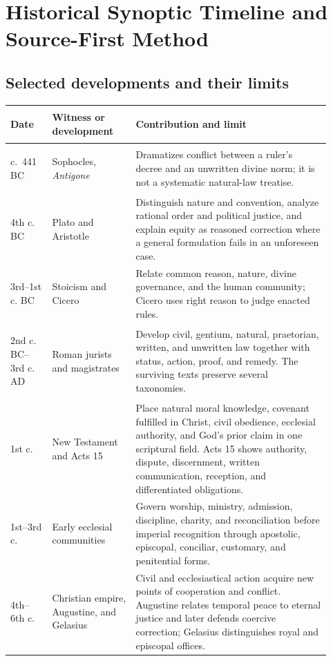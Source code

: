 \section{Historical Synoptic Timeline and Source-First Method}

\subsection{Selected developments and their limits}

\begin{longtable}{>{\bfseries\raggedright\arraybackslash}p{0.12\linewidth}>{\raggedright\arraybackslash}p{0.24\linewidth}>{\raggedright\arraybackslash}p{0.56\linewidth}}
\toprule
\textbf{Date} & \textbf{Witness or development} & \textbf{Contribution and limit}\\
\midrule
\endhead
c.~441 BC & Sophocles, \emph{Antigone} & Dramatizes conflict between a ruler's decree and an unwritten divine norm; it is not a systematic natural-law treatise.\\
4th c. BC & Plato and Aristotle & Distinguish nature and convention, analyze rational order and political justice, and explain equity as reasoned correction where a general formulation fails in an unforeseen case.\\
3rd--1st c. BC & Stoicism and Cicero & Relate common reason, nature, divine governance, and the human community; Cicero uses right reason to judge enacted rules.\\
2nd c. BC--3rd c. AD & Roman jurists and magistrates & Develop civil, gentium, natural, praetorian, written, and unwritten law together with status, action, proof, and remedy. The surviving texts preserve several taxonomies.\\
1st c. & New Testament and Acts 15 & Place natural moral knowledge, covenant fulfilled in Christ, civil obedience, ecclesial authority, and God's prior claim in one scriptural field. Acts 15 shows authority, dispute, discernment, written communication, reception, and differentiated obligations.\\
1st--3rd c. & Early ecclesial communities & Govern worship, ministry, admission, discipline, charity, and reconciliation before imperial recognition through apostolic, episcopal, conciliar, customary, and penitential forms.\\
4th--6th c. & Christian empire, Augustine, and Gelasius & Civil and ecclesiastical action acquire new points of cooperation and conflict. Augustine relates temporal peace to eternal justice and later defends coercive correction; Gelasius distinguishes royal and episcopal offices.\\

\end{longtable}
